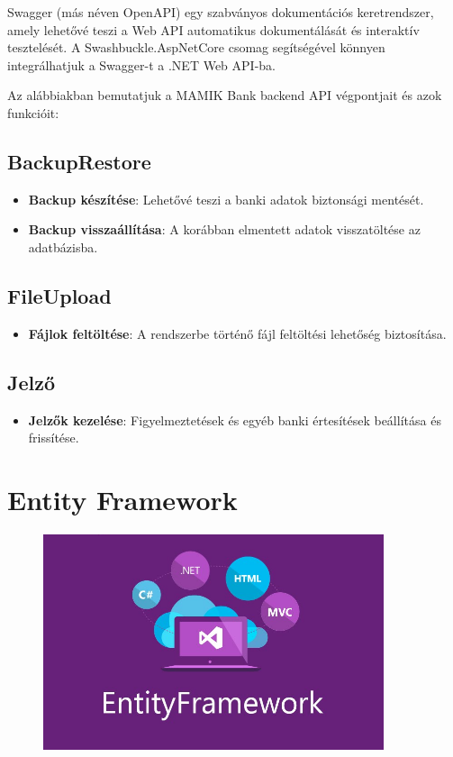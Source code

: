 \documentclass[colorlinks]{thesis-kando}
\theoremstyle{definition}
\theoremstyle{remark}
\begin{document}
Swagger (más néven OpenAPI) egy szabványos dokumentációs keretrendszer, amely lehetővé teszi a Web API automatikus dokumentálását és interaktív tesztelését. A Swashbuckle.AspNetCore csomag segítségével könnyen integrálhatjuk a Swagger-t a .NET Web API-ba.

Az alábbiakban bemutatjuk a MAMIK Bank backend API végpontjait és azok funkcióit:

\subsection{BackupRestore}
\begin{itemize}
    \item \textbf{Backup készítése}: Lehetővé teszi a banki adatok biztonsági mentését.
    \item \textbf{Backup visszaállítása}: A korábban elmentett adatok visszatöltése az adatbázisba.
\end{itemize}

\subsection{FileUpload}
\begin{itemize}
    \item \textbf{Fájlok feltöltése}: A rendszerbe történő fájl feltöltési lehetőség biztosítása.
\end{itemize}

\subsection{Jelző}
\begin{itemize}
    \item \textbf{Jelzők kezelése}: Figyelmeztetések és egyéb banki értesítések beállítása és frissítése.
\end{itemize}
\newpage
\section{Entity Framework}
\begin{figure}
    \centering
    \includegraphics[width=10cm]{figures/entityframework.png}
\end{figure}
\end{document}
